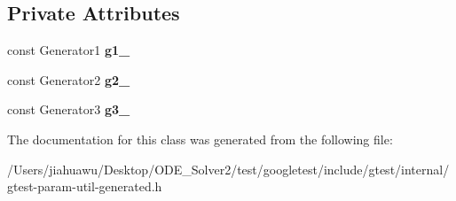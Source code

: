 \subsection*{Private Attributes}
\begin{DoxyCompactItemize}
\item 
\mbox{\label{classtesting_1_1internal_1_1_cartesian_product_holder3_a35cd85b4bf7a73e4fbea38226479898f}} 
const Generator1 {\bfseries g1\+\_\+}
\item 
\mbox{\label{classtesting_1_1internal_1_1_cartesian_product_holder3_ac96127870d5a27053886931468ee20c7}} 
const Generator2 {\bfseries g2\+\_\+}
\item 
\mbox{\label{classtesting_1_1internal_1_1_cartesian_product_holder3_a5ac21826f78dc70ba258cfc08023402c}} 
const Generator3 {\bfseries g3\+\_\+}
\end{DoxyCompactItemize}


The documentation for this class was generated from the following file\+:\begin{DoxyCompactItemize}
\item 
/\+Users/jiahuawu/\+Desktop/\+O\+D\+E\+\_\+\+Solver2/test/googletest/include/gtest/internal/gtest-\/param-\/util-\/generated.\+h\end{DoxyCompactItemize}
